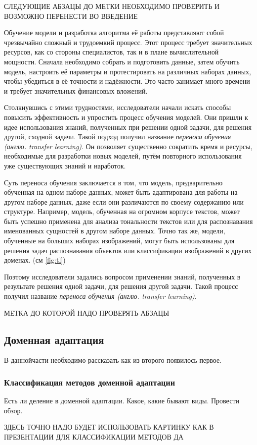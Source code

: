 СЛЕДУЮЩИЕ АБЗАЦЫ ДО МЕТКИ НЕОБХОДИМО ПРОВЕРИТЬ И ВОЗМОЖНО ПЕРЕНЕСТИ ВО ВВЕДЕНИЕ

Обучение модели и разработка алгоритма её работы представляют собой чрезвычайно сложный и трудоемкий процесс. Этот процесс требует значительных ресурсов, как со стороны специалистов, так и в плане вычислительной мощности. Сначала необходимо собрать и подготовить данные, затем обучить модель, настроить её параметры и протестировать на различных наборах данных, чтобы убедиться в её точности и надёжности. Это часто занимает много времени и требует значительных финансовых вложений. 

Столкнувшись с этими трудностями, исследователи начали искать способы повысить эффективность и упростить процесс обучения моделей. Они пришли к идее использования знаний, полученных при решении одной задачи, для решения другой, сходной задачи. Такой подход получил название \textit{переноса обучения (англю. transfer learning)}. Он позволяет существенно сократить время и ресурсы, необходимые для разработки новых моделей, путём повторного использования уже существующих знаний и наработок.


Суть переноса обучения заключается в том, что модель, предварительно обученная на одном наборе данных, может быть адаптирована для работы на другом наборе данных, даже если они различаются по своему содержанию или структуре. Например, модель, обученная на огромном корпусе текстов, может быть успешно применена для анализа тональности текстов или для распознавания именованных сущностей в другом наборе данных. Точно так же, модели, обученные на больших наборах изображений, могут быть использованы для решения задач распознавания объектов или классификации изображений в других доменах. (см \autoref{fig:tl})

Поэтому исследователи задались вопросом применении знаний, полученных в результате решения одной задачи, для решения другой задачи. Такой процесс получил название \textit{переноса обучения (англю. transfer learning)}.  

МЕТКА ДО КОТОРОЙ НАДО ПРОВЕРЯТЬ АБЗАЦЫ

\subsection{Доменная адаптация}

В даннойчасти необходимо рассказать как из второго появилось первое.

\subsubsection{Классификация методов доменной адаптации}

Есть ли деление в доменной адаптации. Какое, какие бывают виды. Провести обзор.

ЗДЕСЬ ТОЧНО НАДО БУДЕТ ИСПОЛЬЗОВАТЬ КАРТИНКУ КАК В ПРЕЗЕНТАЦИИ ДЛЯ КЛАССИФИКАЦИИ МЕТОДОВ ДА

\newpage
